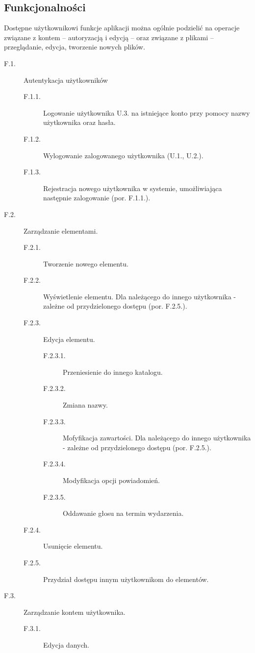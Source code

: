 \documentclass[a4paper,twoside,12pt]{book}
\begin{document}
\subsection{Funkcjonalności}
Dostępne użytkownikowi funkcje aplikacji można ogólnie podzielić na operacje związane z kontem -- autoryzacją i edycją -- oraz związane z plikami -- przeglądanie, edycja, tworzenie nowych plików.
\begin{description}
	\item [F.1.] Autentykacja użytkowników
	\begin{description}
		\item [F.1.1.] Logowanie użytkownika U.3. na istniejące konto przy pomocy nazwy użytkownika oraz hasła.
		\item [F.1.2.] Wylogowanie zalogowanego użytkownika (U.1., U.2.).
		\item [F.1.3.] Rejestracja nowego użytkownika w systemie, umożliwiająca następnie zalogowanie (por. F.1.1.).
	\end{description}
	\item [F.2.] Zarządzanie elementami.
	\begin{description}
		\item [F.2.1.] Tworzenie nowego elementu.
		\item [F.2.2.] Wyświetlenie elementu. Dla należącego do innego użytkownika - zależne od przydzielonego dostępu (por. F.2.5.).
		\item [F.2.3.] Edycja elementu.
		\begin{description}
			\item [F.2.3.1.] Przeniesienie do innego katalogu.
			\item [F.2.3.2.] Zmiana nazwy.
			\item [F.2.3.3.] Mofyfikacja zawartości. Dla należącego do innego użytkownika - zależne od przydzielonego dostępu (por. F.2.5.).
			\item [F.2.3.4.] Modyfikacja opcji powiadomień.
			\item [F.2.3.5.] Oddawanie głosu na termin wydarzenia.
		\end{description}
		\item [F.2.4.] Usunięcie elementu.
		\item [F.2.5.] Przydział dostępu innym użytkownikom do elementów.
	\end{description}
	\item [F.3.] Zarządzanie kontem użytkownika.
	\begin{description}
		\item [F.3.1.] Edycja danych.

\end{description}
\end{description}
\end{document}
